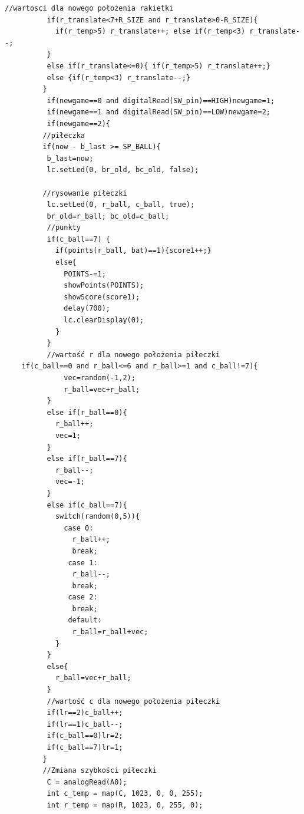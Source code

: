 \documentclass[12pt,notitlepage]{article}
\begin{document}
\begin{lstlisting}[style=CStyle]
          //wartosci dla nowego położenia rakietki
          if(r_translate<7+R_SIZE and r_translate>0-R_SIZE){
            if(r_temp>5) r_translate++; else if(r_temp<3) r_translate--;
          }
          else if(r_translate<=0){ if(r_temp>5) r_translate++;}
          else {if(r_temp<3) r_translate--;}
         }
          if(newgame==0 and digitalRead(SW_pin)==HIGH)newgame=1;
          if(newgame==1 and digitalRead(SW_pin)==LOW)newgame=2;
          if(newgame==2){
         //piłeczka
         if(now - b_last >= SP_BALL){
          b_last=now;
          lc.setLed(0, br_old, bc_old, false);
          
         //rysowanie piłeczki
          lc.setLed(0, r_ball, c_ball, true);          
          br_old=r_ball; bc_old=c_ball;
          //punkty
          if(c_ball==7) {
            if(points(r_ball, bat)==1){score1++;}
            else{
              POINTS-=1;
              showPoints(POINTS);
              showScore(score1);
              delay(700);
              lc.clearDisplay(0);
            }
          }          
          //wartość r dla nowego położenia piłeczki
	if(c_ball==0 and r_ball<=6 and r_ball>=1 and c_ball!=7){		  
              vec=random(-1,2);
              r_ball=vec+r_ball;
          }
          else if(r_ball==0){
            r_ball++;
            vec=1;
          }
          else if(r_ball==7){
            r_ball--;
            vec=-1;
          }
          else if(c_ball==7){
            switch(random(0,5)){
              case 0:
                r_ball++;
                break;
               case 1:
                r_ball--;
                break;
               case 2:
                break;
               default:
                r_ball=r_ball+vec; 
            }
          }
          else{
            r_ball=vec+r_ball;
          }
          //wartość c dla nowego położenia piłeczki
          if(lr==2)c_ball++;
          if(lr==1)c_ball--;
          if(c_ball==0)lr=2;
          if(c_ball==7)lr=1;
         }
         //Zmiana szybkości piłeczki
          C = analogRead(A0);
          int c_temp = map(C, 1023, 0, 0, 255);
          int r_temp = map(R, 1023, 0, 255, 0);
          

\end{lstlisting}
\end{document}
